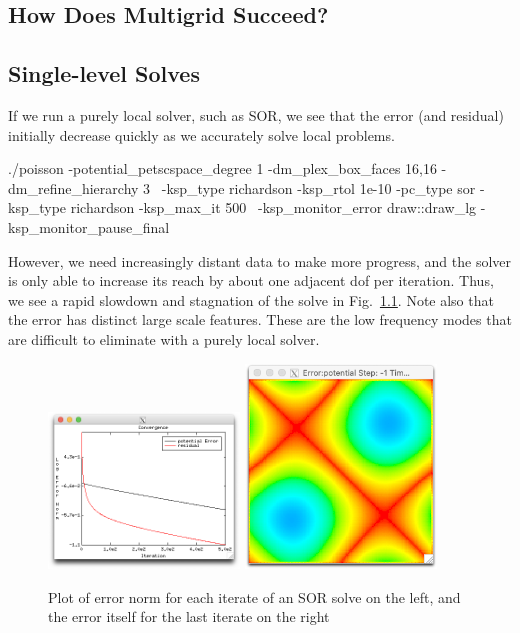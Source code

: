 \begin{refsection}
\chapter{How Does Multigrid Succeed?}\label{ch:success}

\section{Single-level Solves}

If we run a purely local solver, such as SOR, we see that the error (and residual) initially decrease quickly as we accurately solve local problems.
\begin{bash}
  ./poisson -potential_petscspace_degree 1 -dm_plex_box_faces 16,16 -dm_refine_hierarchy 3 \
    -ksp_type richardson -ksp_rtol 1e-10 -pc_type sor -ksp_type richardson -ksp_max_it 500 \
    -ksp_monitor_error draw::draw_lg -ksp_monitor_pause_final
\end{bash}
However, we need increasingly distant data to make more progress, and the solver is only able to increase its reach by about one adjacent dof per iteration. Thus, we see a rapid slowdown and stagnation of the solve in Fig.~\ref{fig:errorSOR}. Note also that the error has distinct large scale features. These are the low frequency modes that are difficult to eliminate with a purely local solver.

\begin{figure}
\centering
\includegraphics[width=2in]{figures/errorSORLG.png}\hfil
\includegraphics[width=2in]{figures/errorSORLast.png}
\caption{Plot of error norm for each iterate of an SOR solve on the left, and the error itself for the last iterate on the right\label{fig:errorSOR}}
\end{figure}


\end{refsection}
